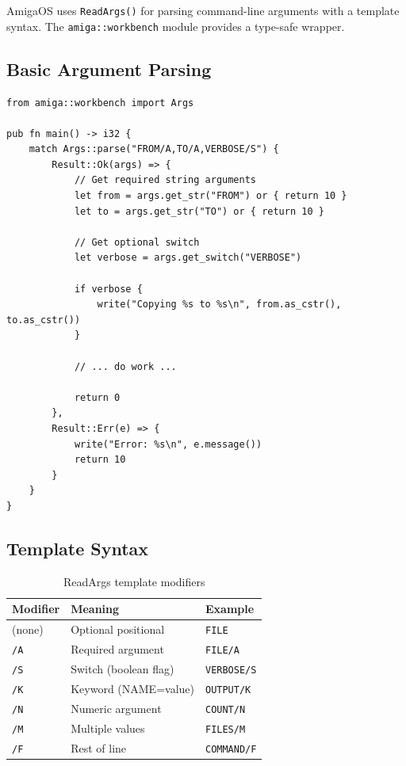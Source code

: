 AmigaOS uses \texttt{ReadArgs()} for parsing command-line arguments with a template syntax. The \texttt{amiga::workbench} module provides a type-safe wrapper.

\subsection{Basic Argument Parsing}

\begin{lstlisting}
from amiga::workbench import Args

pub fn main() -> i32 {
    match Args::parse("FROM/A,TO/A,VERBOSE/S") {
        Result::Ok(args) => {
            // Get required string arguments
            let from = args.get_str("FROM") or { return 10 }
            let to = args.get_str("TO") or { return 10 }

            // Get optional switch
            let verbose = args.get_switch("VERBOSE")

            if verbose {
                write("Copying %s to %s\n", from.as_cstr(), to.as_cstr())
            }

            // ... do work ...

            return 0
        },
        Result::Err(e) => {
            write("Error: %s\n", e.message())
            return 10
        }
    }
}
\end{lstlisting}

\subsection{Template Syntax}

\begin{table}[h]
\centering
\begin{tabular}{lll}
\textbf{Modifier} & \textbf{Meaning} & \textbf{Example} \\
\hline
(none) & Optional positional & \texttt{FILE} \\
\texttt{/A} & Required argument & \texttt{FILE/A} \\
\texttt{/S} & Switch (boolean flag) & \texttt{VERBOSE/S} \\
\texttt{/K} & Keyword (NAME=value) & \texttt{OUTPUT/K} \\
\texttt{/N} & Numeric argument & \texttt{COUNT/N} \\
\texttt{/M} & Multiple values & \texttt{FILES/M} \\
\texttt{/F} & Rest of line & \texttt{COMMAND/F} \\
\end{tabular}
\caption{ReadArgs template modifiers}
\end{table}

